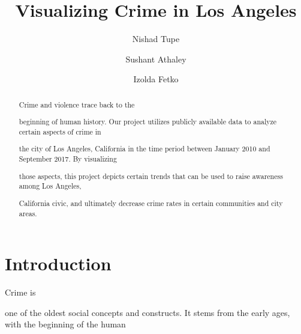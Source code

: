 \documentclass[sigconf]{acmart}
\begin{document}
\title{Visualizing Crime in Los Angeles}

\author{Nishad Tupe}

\author{Sushant Athaley}

\author{Izolda Fetko}


\begin{abstract}

Crime and violence trace back to the 

beginning of human history. Our project utilizes publicly available data to analyze certain aspects of crime in 

the city of Los Angeles, California in the time period between January 2010 and September 2017. By visualizing 

those aspects, this project depicts certain trends that can be used to raise awareness among Los Angeles, 

California civic, and ultimately decrease crime rates in certain communities and city areas.

\end{abstract}


\maketitle

\section{Introduction}

Crime is 

one of the oldest social concepts and constructs. It stems from the early ages, with the beginning of the human 
\end{document}
